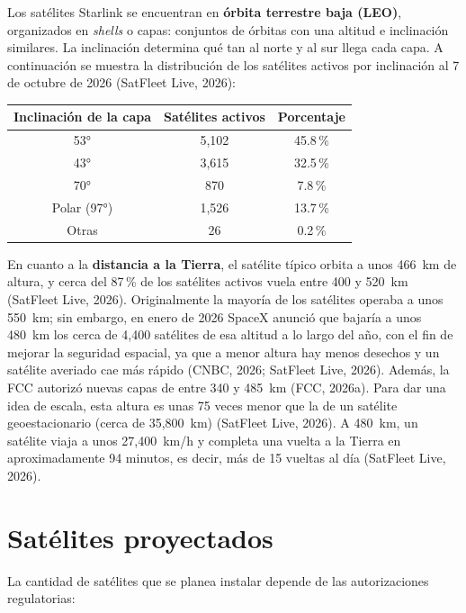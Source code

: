 \documentclass[12pt,letterpaper]{article}
\begin{document}
Los satélites Starlink se encuentran en \textbf{órbita terrestre baja (LEO)}, organizados en \textit{shells} o capas: conjuntos de órbitas con una altitud e inclinación similares. La inclinación determina qué tan al norte y al sur llega cada capa. A continuación se muestra la distribución de los satélites activos por inclinación al 7 de octubre de 2026 (SatFleet Live, 2026):

\begin{center}
\begin{tabular}{|c|c|c|}
\hline
\textbf{Inclinación de la capa} & \textbf{Satélites activos} & \textbf{Porcentaje} \\
\hline
53° & 5,102 & 45.8\,\% \\
\hline
43° & 3,615 & 32.5\,\% \\
\hline
70° & 870 & 7.8\,\% \\
\hline
Polar (97°) & 1,526 & 13.7\,\% \\
\hline
Otras & 26 & 0.2\,\% \\
\hline
\end{tabular}
\end{center}

En cuanto a la \textbf{distancia a la Tierra}, el satélite típico orbita a unos 466~km de altura, y cerca del 87\,\% de los satélites activos vuela entre 400 y 520~km (SatFleet Live, 2026). Originalmente la mayoría de los satélites operaba a unos 550~km; sin embargo, en enero de 2026 SpaceX anunció que bajaría a unos 480~km los cerca de 4,400 satélites de esa altitud a lo largo del año, con el fin de mejorar la seguridad espacial, ya que a menor altura hay menos desechos y un satélite averiado cae más rápido (CNBC, 2026; SatFleet Live, 2026). Además, la FCC autorizó nuevas capas de entre 340 y 485~km (FCC, 2026a). Para dar una idea de escala, esta altura es unas 75 veces menor que la de un satélite geoestacionario (cerca de 35,800~km) (SatFleet Live, 2026). A 480~km, un satélite viaja a unos 27,400~km/h y completa una vuelta a la Tierra en aproximadamente 94 minutos, es decir, más de 15 vueltas al día (SatFleet Live, 2026).

\section{Satélites proyectados}

La cantidad de satélites que se planea instalar depende de las autorizaciones regulatorias:
\end{document}
